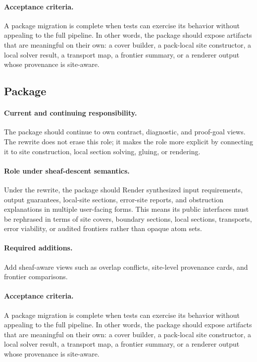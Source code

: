 \documentclass[11pt]{report}
\DeclareRobustCommand{\py}[1]{\texttt{\detokenize{#1}}}
\theoremstyle{definition}
\theoremstyle{plain}
\begin{document}
\paragraph{Acceptance criteria.}
A package migration is complete when tests can exercise its behavior without
appealing to the full pipeline. In other words, the package should expose
artifacts that are meaningful on their own: a cover builder, a pack-local
site constructor, a local solver result, a transport map, a frontier summary,
or a renderer output whose provenance is site-aware.

\subsection{Package \py{src/deppy/render}}

\paragraph{Current and continuing responsibility.}
The package \py{src/deppy/render} should continue to own contract, diagnostic, and proof-goal views. The
rewrite does not erase this role; it makes the role more explicit by
connecting it to site construction, local section solving, gluing, or
rendering.

\paragraph{Role under sheaf-descent semantics.}
Under the rewrite, the package should Render synthesized input requirements, output guarantees, local-site sections, error-site reports, and obstruction explanations in multiple user-facing forms. This means its public
interfaces must be rephrased in terms of site covers, boundary sections,
local sections, transports, error viability, or audited frontiers rather
than opaque atom sets.

\paragraph{Required additions.}
Add sheaf-aware views such as overlap conflicts, site-level provenance cards, and frontier comparisons.

\paragraph{Acceptance criteria.}
A package migration is complete when tests can exercise its behavior without
appealing to the full pipeline. In other words, the package should expose
artifacts that are meaningful on their own: a cover builder, a pack-local
site constructor, a local solver result, a transport map, a frontier summary,
or a renderer output whose provenance is site-aware.
\end{document}
